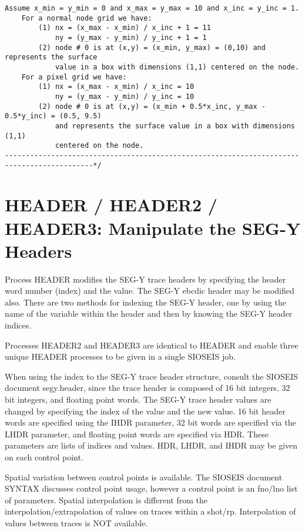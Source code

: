\begin{lstlisting}[caption={gmt\_grd.h}]
	Assume x_min = y_min = 0 and x_max = y_max = 10 and x_inc = y_inc = 1.
	For a normal node grid we have:
		(1) nx = (x_max - x_min) / x_inc + 1 = 11
		    ny = (y_max - y_min) / y_inc + 1 = 1
		(2) node # 0 is at (x,y) = (x_min, y_max) = (0,10) and represents the surface
		    value in a box with dimensions (1,1) centered on the node.
	For a pixel grid we have:
		(1) nx = (x_max - x_min) / x_inc = 10
		    ny = (y_max - y_min) / y_inc = 10
		(2) node # 0 is at (x,y) = (x_min + 0.5*x_inc, y_max - 0.5*y_inc) = (0.5, 9.5)
		    and represents the surface value in a box with dimensions (1,1)
		    centered on the node.
-------------------------------------------------------------------------------------------*/
\end{lstlisting}

\section{HEADER / HEADER2 / HEADER3: Manipulate the SEG-Y Headers}
\label{cmd_header}

Process HEADER modifies the SEG-Y trace headers by specifying the header
word number (index) and the value.  The SEG-Y \gls{ebcdic} header may be
modified also.  There are two methods for indexing the SEG-Y header, one
by using the name of the variable within the header and then by knowing
the SEG-Y header indices.

Processes HEADER2 and HEADER3 are identical to HEADER and enable three
unique HEADER processes to be given in a single SIOSEIS job.

When using the index to the SEG-Y trace header structure, consult the
SIOSEIS document segy.header, since the trace header is composed of 16
bit integers, 32 bit integers, and floating point words.  The SEG-Y trace
header values are changed by specifying the index of the value and the
new value.  16 bit header words are specified using the IHDR parameter,
32 bit words are specified via the LHDR parameter, and floating point
words are specified via HDR.  These parameters are lists of indices and
values.  HDR, LHDR, and IHDR may be given on each control point.

Spatial variation between control points is available.   The SIOSEIS
document SYNTAX discusses control point usage, however a control point
is an fno/lno list of parameters.  Spatial interpolation is different
from the interpolation/extrapolation of values on traces within a
shot/\gls{rp}.  Interpolation of values between traces is NOT available.

